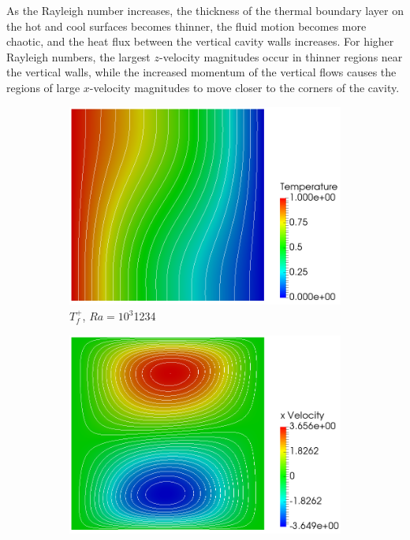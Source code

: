 As the Rayleigh number increases, the thickness of the thermal boundary layer on the hot and cool surfaces becomes thinner, the fluid motion becomes more chaotic, and the heat flux between the vertical cavity walls increases. For higher Rayleigh numbers, the largest \(z\)-velocity magnitudes occur in thinner regions near the vertical walls, while the increased momentum of the vertical flows causes the regions of large \(x\)-velocity magnitudes to move closer to the corners of the cavity.

\begin{figure}[!h]
\centering
\begin{subfigure}{0.32\textwidth}
  \centering
  \includegraphics[width=\linewidth]{figs/Ra3_t.png}
  \caption{\(T_f^+\), \(Ra=10^3\)\color{white}1234}
    \vspace*{0.5em}
\end{subfigure}
\begin{subfigure}{0.32\textwidth}
  \centering
  \includegraphics[width=\linewidth]{figs/Ra3_u.png}

\end{subfigure}
\end{figure}

